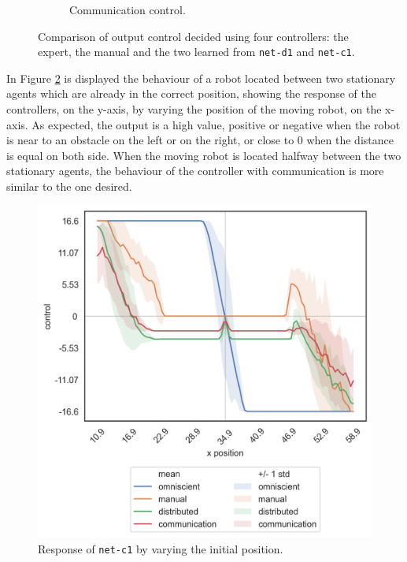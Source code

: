 \begin{figure}[!htb]
\begin{center}
\begin{subfigure}[h]{0.35\textwidth}
			\caption{Communication control.}
		\end{subfigure}
	\end{center}
	\vspace{-0.5cm}
	\caption[Evaluation of the control decided by \texttt{net-c1}.]{Comparison of 
		output control decided using four controllers: the expert, the manual and the 
		two learned from \texttt{net-d1} and \texttt{net-c1}.}
	\label{fig:net-c1control}
\end{figure}

In Figure \ref{fig:net-c1responseposition} is displayed the behaviour of a robot 
located between two stationary agents which are already in the correct position, 
showing the response of the controllers, on the y-axis, by varying the position of 
the moving robot, on the x-axis.  
As expected, the output is a high value, positive or negative when the robot is 
near to an obstacle on the left or on the right, or close to $0$ when the distance is 
equal on both side.
When the moving robot is located halfway between the two stationary agents, the 
behaviour of the controller with communication is more similar to the one desired.
\begin{figure}[!htb]
	\centering
	\includegraphics[width=.45\textwidth]{contents/images/net-c1/response-varying_init_position-communication}%
	\caption{Response of \texttt{net-c1} by varying the initial position.}
	\label{fig:net-c1responseposition}
\end{figure}

